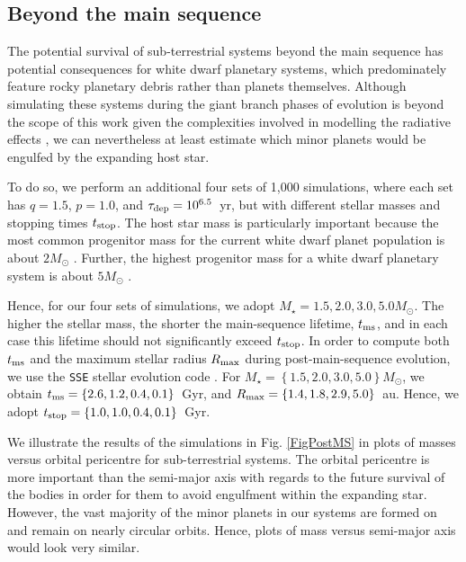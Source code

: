 \documentclass[useAMS,usenatbib]{mn2e}
\begin{document}
\subsection{Beyond the main sequence}

The potential survival of sub-terrestrial systems beyond the main sequence has potential consequences for white dwarf planetary systems, which predominately feature rocky planetary debris rather than planets themselves. Although simulating these systems during the giant branch phases of evolution is beyond the scope of this work given the complexities involved in modelling the radiative effects \citep{veretal2019,feretal2022,lietal2024}, we can nevertheless at least estimate which minor planets would be engulfed by the expanding host star.

To do so, we perform an additional four sets of 1,000 simulations, where each set has $q=1.5$, $p=1.0$, and $\tau_{\rm dep}=10^{6.5}$~yr, but with different stellar masses and stopping times $t_{\rm stop}$. The host star mass is particularly important because the most common progenitor mass for the current white dwarf planet population is about $2M_{\odot}$ \citep{cumetal2018,cunetal2024}. Further, the highest progenitor mass for a white dwarf planetary system is about $5M_{\odot}$ \citep{holetal2021}.

Hence, for our four sets of simulations, we adopt $M_{\star} = 1.5, 2.0, 3.0, 5.0M_{\odot}$. The higher the stellar mass, the shorter the main-sequence lifetime, $t_{\rm ms}$, and in each case this lifetime should not significantly exceed $t_{\rm stop}$. In order to compute both $t_{\rm ms}$ and the maximum stellar radius $R_{\rm max}$ during post-main-sequence evolution, we use the {\tt SSE} stellar evolution code \citep{huretal2000}. For $M_{\star} = \left\lbrace 1.5, 2.0, 3.0, 5.0 \right\rbrace M_{\odot}$, we obtain $t_{\rm ms} = \left\lbrace 2.6, 1.2, 0.4, 0.1 \right\rbrace$~Gyr, and $R_{\rm max} = \left\lbrace 1.4, 1.8, 2.9, 5.0 \right\rbrace$~au. Hence, we adopt $t_{\rm stop} = \left\lbrace 1.0, 1.0, 0.4, 0.1 \right\rbrace$~Gyr.

We illustrate the results of the simulations in Fig. \ref{FigPostMS} in plots of masses versus orbital pericentre for sub-terrestrial systems. The orbital pericentre is more important than the semi-major axis with regards to the future survival of the bodies in order for them to avoid engulfment within the expanding star. However, the vast majority of the minor planets in our systems are formed on and remain on nearly circular orbits. Hence, plots of mass versus semi-major axis would look very similar.
\end{document}
